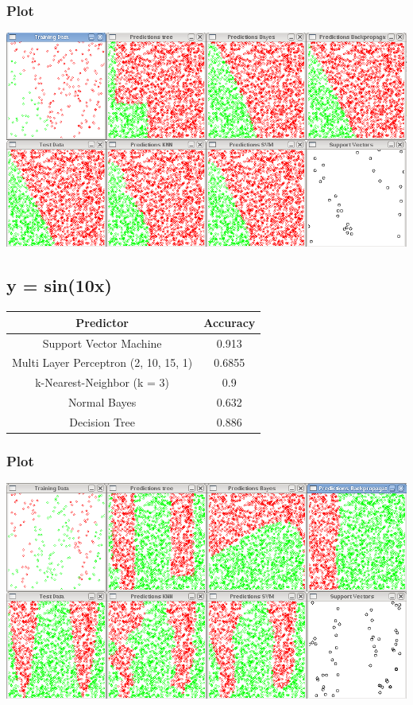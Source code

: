 \subsubsection{Plot}
\includegraphics[scale=0.4]{img/eval/2x.png}

\subsection{y = sin(10x)}

\begin{tabular}{|c|c|}
\hline
Predictor &	Accuracy\\ \hline\hline
Support Vector Machine &	0.913\\ \hline
Multi Layer Perceptron (2, 10, 15, 1) & 0.6855\\ \hline
k-Nearest-Neighbor (k = 3) & 0.9\\ \hline
Normal Bayes & 0.632\\ \hline
Decision Tree &	0.886\\ \hline
\end{tabular}

\subsubsection{Plot}
\includegraphics[scale=0.4]{img/eval/sin10x.png}

